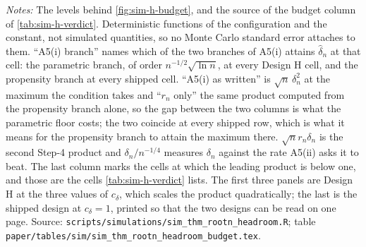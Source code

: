 \documentclass[
  12pt]{article}
\newcommand{\1}[1]{\mathds{1}\left[#1\right]}
\theoremstyle{plain}
\theoremstyle{definition}
\theoremstyle{definition}
\theoremstyle{remark}
\begin{document}
\begin{table}[!htbp]
\centering
\begin{threeparttable}
\caption{The remainder ledger at Design H, with the shipped design for reference}
\label{tab:supp-h-budget}
\scriptsize

\begin{tablenotes}\footnotesize
\item \textit{Notes:} The levels behind \cref{fig:sim-h-budget}, and the source
of the budget column of \cref{tab:sim-h-verdict}. Deterministic functions of the
configuration and the constant, not simulated quantities, so no Monte Carlo
standard error attaches to them. ``A5(i) branch'' names which of the two branches
of A5(i) attains $\hat\delta_n$ at that cell: the parametric branch, of order
$n^{-1/2}\sqrt{\ln n}$, at every Design H cell, and the propensity branch at every
shipped cell. ``A5(i) as written'' is $\sqrt n\,\delta_n^{2}$ at the maximum the
condition takes and ``$r_n$ only'' the same product computed from the propensity
branch alone, so the gap between the two columns is what the parametric floor
costs; the two coincide at every shipped row, which is what it means for the
propensity branch to attain the maximum there. $\sqrt n r_n\delta_n$ is the
second Step-4 product and $\delta_n/n^{-1/4}$ measures $\delta_n$ against the
rate A5(ii) asks it to beat. The last column marks the cells at which the leading
product is below one, and those are the cells \cref{tab:sim-h-verdict} lists. The
first three panels are Design H at the three values of $c_\delta$, which scales
the product quadratically; the last is the shipped design at $c_\delta=1$,
printed so that the two designs can be read on one page. Source:
\texttt{scripts/simulations/sim\_thm\_rootn\_headroom.R}; table
\texttt{paper/tables/sim/sim\_thm\_rootn\_headroom\_budget.tex}.
\end{tablenotes}
\end{threeparttable}
\end{table}
\end{document}
